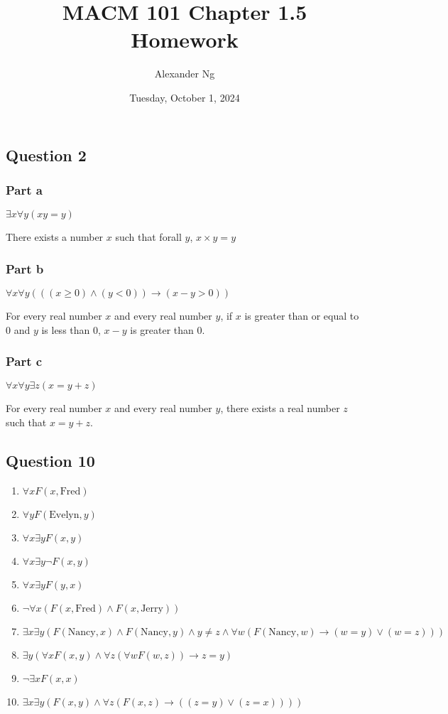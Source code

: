 \documentclass[12pt]{article}
\begin{document}
\title{MACM 101 Chapter 1.5 Homework}
\author{Alexander Ng}
\date{Tuesday, October 1, 2024}

\maketitle

\subsection*{Question 2}

\subsubsection*{Part a}

$\exists x \forall y (xy=y)$

There exists a number $x$ such that forall $y$, $x \times y = y$

\subsubsection*{Part b}

$\forall x \forall y (((x \geq 0) \land (y < 0)) \to (x - y > 0))$

For every real number $x$ and every real number $y$, if $x$ is greater than or
equal to $0$ and $y$ is less than $0$, $x-y$ is greater than $0$.

\subsubsection*{Part c}

$\forall x \forall y \exists z (x = y + z)$

For every real number $x$ and every real number $y$, there exists a real number
$z$ such that $x = y + z$.

\subsection*{Question 10}

\begin{enumerate}[label=(\alph*)]
  \item $\forall x F(x, \text{Fred} )$
  \item $\forall y F(\text{Evelyn} , y)$
  \item $\forall x \exists y F(x, y)$
  \item $\forall x \exists y \neg F(x, y)$
  \item $\forall x \exists y F(y, x)$
  \item $\neg \forall x ( F(x, \text{Fred} ) \land F(x, \text{Jerry} )) $
  \item $\exists x \exists y( F(\text{Nancy} , x) \land F(\text{Nancy}, y) \land y
    \ne z \land \forall w (F(\text{Nancy} , w) \to (w = y) \lor (w = z)))$
  \item $\exists y (\forall x F(x, y) \land \forall z(\forall w F(w, z)) \to z = y)$
  \item $\neg \exists x F(x, x)$
  \item $\exists x \exists y (F(x, y) \land \forall z (F(x, z) \to ((z = y) \lor (z = x))))$
\end{enumerate}
\end{document}
